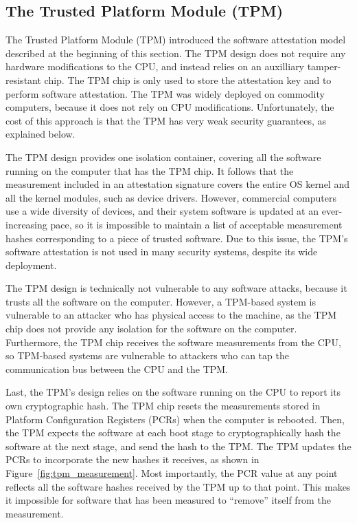\subsection{The Trusted Platform Module (TPM)}

The Trusted Platform Module (TPM) \cite{grawrock2003tpm} introduced the
software attestation model described at the beginning of this section. The TPM
design does not require any hardware modifications to the CPU, and instead
relies on an auxilliary tamper-resistant chip. The TPM chip is only used to
store the attestation key and to perform software attestation. The TPM was
widely deployed on commodity computers, because it does not rely on CPU
modifications. Unfortunately, the cost of this approach is that the TPM has
very weak security guarantees, as explained below.

The TPM design provides one isolation container, covering all the software
running on the computer that has the TPM chip. It follows that the measurement
included in an attestation signature covers the entire OS kernel and all the
kernel modules, such as device drivers. However, commercial computers use a
wide diversity of devices, and their system software is updated at an
ever-increasing pace, so it is impossible to maintain a list of acceptable
measurement hashes corresponding to a piece of trusted software. Due to this
issue, the TPM's software attestation is not used in many security systems,
despite its wide deployment.

The TPM design is technically not vulnerable to any software attacks, because
it trusts all the software on the computer. However, a TPM-based system is
vulnerable to an attacker who has physical access to the machine, as the TPM
chip does not provide any isolation for the software on the computer.
Furthermore, the TPM chip receives the software measurements from the CPU,
so TPM-based systems are vulnerable to attackers who can tap the communication
bus between the CPU and the TPM.

Last, the TPM's design relies on the software running on the CPU to report its
own cryptographic hash. The TPM chip resets the measurements stored in Platform
Configuration Registers (PCRs) when the computer is rebooted. Then, the TPM
expects the software at each boot stage to cryptographically hash the software
at the next stage, and send the hash to the TPM. The TPM updates the PCRs to
incorporate the new hashes it receives, as shown in
Figure~\ref{fig:tpm_measurement}. Most importantly, the PCR value at any point
reflects all the software hashes received by the TPM up to that point. This
makes it impossible for software that has been measured to ``remove'' itself
from the measurement.

